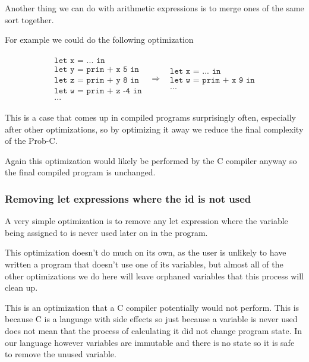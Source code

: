 \documentclass[a4paper]{article}
\newcommand{\optimization}[2]{
	\[
		\begin{array}{rcl}
			#1 & \Rightarrow & #2
		\end{array}
	\]
}
\begin{document}
Another thing we can do with arithmetic expressions is to merge ones of the same sort together.

For example we could do the following optimization
\optimization{
	\begin{array}{l}
		\texttt{let x = ... in} \\
		\texttt{let y = prim + x 5 in} \\
		\texttt{let z = prim + y 8 in} \\
		\texttt{let w = prim + z -4 in} \\
		\texttt{...}
	\end{array}
}{
	\begin{array}{l}
		\texttt{let x = ... in} \\
		\texttt{let w = prim + x 9 in} \\
		\texttt{...}
	\end{array}
}
This is a case that comes up in compiled programs surprisingly often, especially after other optimizations, so by optimizing it away we reduce the final complexity of the Prob-C.

Again this optimization would likely be performed by the C compiler anyway so the final compiled program is unchanged.




\subsubsection{Removing let expressions where the id is not used}

A very simple optimization is to remove any let expression where the variable being assigned to is never used later on in the program.

This optimization doesn't do much on its own, as the user is unlikely to have written a program that doesn't use one of its variables, but almost all of the other optimizations we do here will leave orphaned variables that this process will clean up.

This is an optimization that a C compiler potentially would not perform. This is because C is a language with side effects so just because a variable is never used does not mean that the process of calculating it did not change program state. In our language however variables are immutable and there is no state so it is safe to remove the unused variable.
\end{document}
